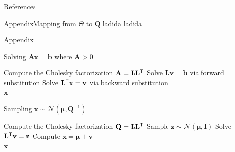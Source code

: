\documentclass[xcolor=svgnames, 10pt, aspectratio=169]{beamer}
\newcommand\transpose[1]{{#1}^{\sf{T}}}
\begin{document}
\begin{frame}[t, allowframebreaks]{References}
    \scriptsize     
    
    
\end{frame}

\begin{frame}{Appendix}{Mapping from $\Theta$ to $\mathbf{Q}$}
\label{app_mapping}
ladida
ladida
\end{frame}

\begin{frame}{Appendix}{\citet[][Algorithm 2.1, 2.4]{rueheld_book2005}}
    \label{app_rueheld_algs}
    \setcounter{algorithm}{0}
    \begin{algorithm}[H]
        \caption{Solving $\mathbf{A} \mathbf{x} = \mathbf{b}$ where $\mathbf{A} > 0$}
        \begin{algorithmic}[1]
            \State Compute the Cholesky factorization $\mathbf{A} = \mathbf{L}\transpose{\mathbf{L}}$
            \State Solve $\mathbf{L}\mathbf{v} = \mathbf{b}$ via forward substitution
            \State Solve $\transpose{\mathbf{L}}\mathbf{x} = \mathbf{v}$ via backward substitution\\
            \Return $\mathbf{x}$
        \end{algorithmic}
    \end{algorithm}
    \setcounter{algorithm}{3}
    \begin{algorithm}[H]
        \caption{Sampling $\mathbf{x} \sim \mathcal{N}(\boldsymbol{\mu}, \mathbf{Q}^{-1})$}
        \begin{algorithmic}[1]
            \State Compute the Cholesky factorization $\mathbf{Q} = \mathbf{L}\transpose{\mathbf{L}}$
            \State Sample $\mathbf{z} \sim \mathcal{N}(\boldsymbol{\mu}, \mathbf{I})$
            \State Solve $\transpose{\mathbf{L}} \mathbf{v} = \mathbf{z}$
            \State Compute $\mathbf{x} = \boldsymbol{\mu} + \mathbf{v}$\\
            \Return $\mathbf{x}$
        \end{algorithmic}
    \end{algorithm}

    \hyperlink{precsampl_draw_eta}{}
\end{frame}
\end{document}
